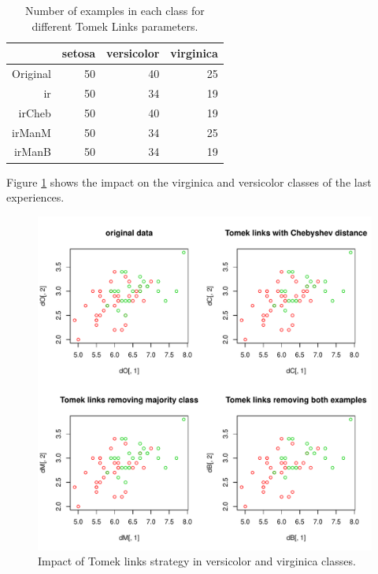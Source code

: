 \documentclass[10pt,a4paper]{article}\usepackage[]{graphicx}\usepackage[]{color}
\makeatletter
\def\maxwidth{ %
  \ifdim\Gin@nat@width>\linewidth
    \linewidth
  \else
    \Gin@nat@width
  \fi
}
\newenvironment{knitrout}{}{} %
\makeatother
\begin{document}
\begin{table}[ht]
\centering
\begin{tabular}{rrrr}
  \hline
 & setosa & versicolor & virginica \\ 
  \hline
Original &  50 &  40 &  25 \\ 
  ir &  50 &  34 &  19 \\ 
  irCheb &  50 &  40 &  19 \\ 
  irManM &  50 &  34 &  25 \\ 
  irManB &  50 &  34 &  19 \\ 
   \hline
\end{tabular}
\caption{Number of examples in each class for different Tomek Links parameters.} 
\label{tab:TL_table}
\end{table}



Figure \ref{fig:TL_difPar} shows the impact on the virginica and versicolor classes of the last experiences.

\begin{knitrout}\footnotesize
{}\color{fgcolor}\begin{figure}

{\centering \includegraphics[width=\maxwidth]{figures/UBL-TL_difPar-1} 

}

\caption[Impact of Tomek links strategy in versicolor and virginica classes]{Impact of Tomek links strategy in versicolor and virginica classes.}\label{fig:TL_difPar}
\end{figure}


\end{knitrout}
\end{document}
